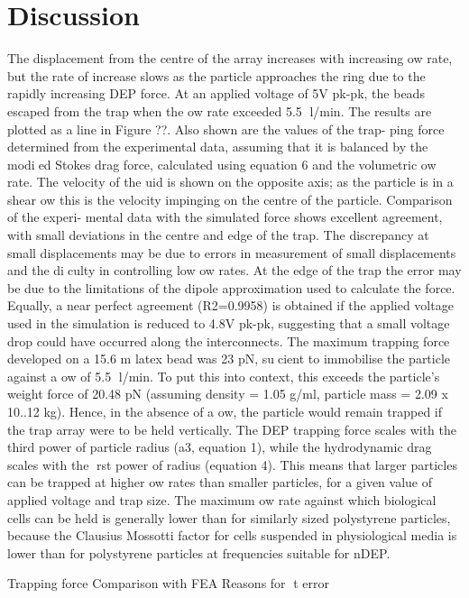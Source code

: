 \section{Discussion}

The displacement from the centre of the array increases with increasing 
ow rate, but
the rate of increase slows as the particle approaches the ring due to the rapidly increasing
DEP force. At an applied voltage of 5V pk-pk, the beads escaped from the trap when
the 
ow rate exceeded 5.5 l/min.
The results are plotted as a line in Figure ??. Also shown are the values of the trap-
ping force determined from the experimental data, assuming that it is balanced by the
modied Stokes drag force, calculated using equation 6 and the volumetric 
ow rate.
The velocity of the 
uid is shown on the opposite axis; as the particle is in a shear 
ow
this is the velocity impinging on the centre of the particle. Comparison of the experi-
mental data with the simulated force shows excellent agreement, with small deviations
in the centre and edge of the trap. The discrepancy at small displacements may be
due to errors in measurement of small displacements and the diculty in controlling
low 
ow rates. At the edge of the trap the error may be due to the limitations of the
dipole approximation used to calculate the force. Equally, a near perfect agreement
(R2=0.9958) is obtained if the applied voltage used in the simulation is reduced to 4.8V
pk-pk, suggesting that a small voltage drop could have occurred along the interconnects.
The maximum trapping force developed on a 15.6 m latex bead was 23 pN, sucient
to immobilise the particle against a 
ow of 5.5 l/min. To put this into context, this
exceeds the particle's weight force of 20.48 pN (assuming density = 1.05 g/ml, particle
mass = 2.09 x 10..12 kg). Hence, in the absence of a 
ow, the particle would remain
trapped if the trap array were to be held vertically. The DEP trapping force scales
with the third power of particle radius (a3, equation 1), while the hydrodynamic drag
scales with the rst power of radius (equation 4). This means that larger particles
can be trapped at higher 
ow rates than smaller particles, for a given value of applied
voltage and trap size. The maximum 
ow rate against which biological cells can be held
is generally lower than for similarly sized polystyrene particles, because the Clausius
Mossotti factor for cells suspended in physiological media is lower than for polystyrene
particles at frequencies suitable for nDEP.

Trapping force Comparison with FEA Reasons for t error

